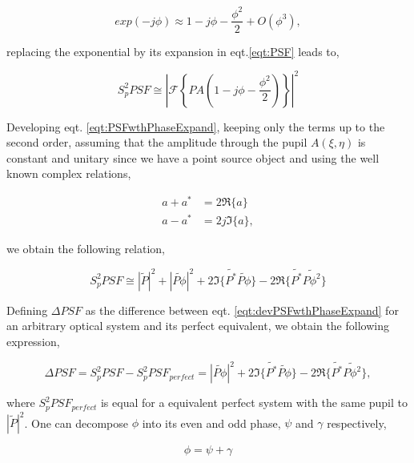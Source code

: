\begin{equation}
exp(-j\phi)\approx 1 - j\phi - \frac{\phi^2}{2} + O(\phi^3),
\label{eqt:expansionPhase}
\end{equation}

replacing the exponential by its expansion in eqt.\eqref{eqt:PSF} leads to,

\begin{equation}
S_p^2 PSF \cong |\mathcal{F}\left\lbrace PA (1-j\phi-\frac{\phi^2}{2}) \right\rbrace|^2
\label{eqt:PSFwthPhaseExpand}
\end{equation}

Developing eqt. \eqref{eqt:PSFwthPhaseExpand}, keeping only the terms up to the second order, assuming that the amplitude through the pupil $A(\xi,\eta)$ is constant and unitary since we have a point source object and using the well known complex relations,

\begin{align}
a + a^* &= 2 \Re \lbrace a \rbrace \nonumber \\
a - a^* &= 2j \Im \lbrace a \rbrace, \nonumber
\end{align}

we obtain the following relation,

\begin{equation}
S_p^2 PSF \cong |\widetilde{P}|^2 + |\widetilde{P\phi}|^2 + 2\Im\lbrace \widetilde{P^*}\widetilde{P \phi}\rbrace - 2\Re\lbrace \widetilde{P^*}\widetilde{P \phi^2}\rbrace
\label{eqt:devPSFwthPhaseExpand}
\end{equation}

Defining $\Delta PSF$ as the difference between eqt. \eqref{eqt:devPSFwthPhaseExpand} for an arbitrary optical system and its perfect equivalent, we obtain the following expression,

\begin{equation}
\Delta PSF = S_p^2 PSF - S_p^2 PSF_{perfect} = |\widetilde{P\phi}|^2 + 2\Im\lbrace \widetilde{P^*}\widetilde{P \phi}\rbrace - 2\Re\lbrace \widetilde{P^*}\widetilde{P \phi^2}\rbrace,
\label{eqt:DeltaPSF}
\end{equation}

where $S_p^2 PSF_{perfect}$ is equal for a equivalent perfect system with the same pupil to $|\widetilde{P}|^2$. One can decompose $\phi$ into its even and odd phase, $\psi$ and $\gamma$ respectively,

\begin{equation}
\phi = \psi + \gamma
\label{eqt:Phidecomposed}
\end{equation}

